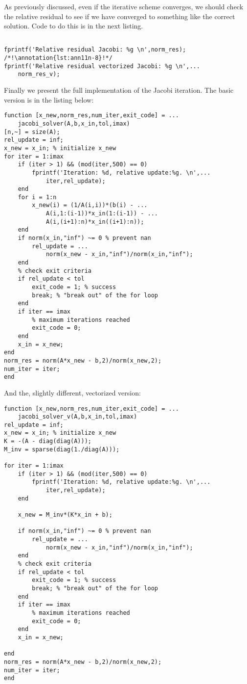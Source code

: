 As previously discussed, even if the iterative scheme converges, we should check the relative residual to see if we have converged to something like the correct solution.  Code to do this is in the next listing.
\begin{lstlisting}[style=myMatlab, name=lec11n_jacobi]
%% Check Relative Residual

fprintf('Relative residual Jacobi: %g \n',norm_res); /*!\annotation{lst:ann11n-8}!*/
fprintf('Relative residual vectorized Jacobi: %g \n',...
    norm_res_v);
\end{lstlisting}

Finally we present the full implementation of the Jacobi iteration.  The basic version is in the listing below:
\begin{lstlisting}[style=myMatlab, name=lec11n-jacobi]
%% Local functions
function [x_new,norm_res,num_iter,exit_code] = ...
    jacobi_solver(A,b,x_in,tol,imax)
[n,~] = size(A);
rel_update = inf;
x_new = x_in; % initialize x_new
for iter = 1:imax
    if (iter > 1) && (mod(iter,500) == 0)
        fprintf('Iteration: %d, relative update:%g. \n',...
            iter,rel_update);
    end 
    for i = 1:n
        x_new(i) = (1/A(i,i))*(b(i) - ...
            A(i,1:(i-1))*x_in(1:(i-1)) - ...
            A(i,(i+1):n)*x_in((i+1):n));
    end
    if norm(x_in,"inf") ~= 0 % prevent nan
        rel_update = ...
            norm(x_new - x_in,"inf")/norm(x_in,"inf");
    end    
    % check exit criteria
    if rel_update < tol
        exit_code = 1; % success
        break; % "break out" of the for loop
    end    
    if iter == imax
        % maximum iterations reached
        exit_code = 0; 
    end
    x_in = x_new;    
end
norm_res = norm(A*x_new - b,2)/norm(x_new,2);
num_iter = iter;
end
\end{lstlisting}
And the, slightly different, vectorized version:

\begin{lstlisting}[style=myMatlab, name=lec11n-jacobi]
function [x_new,norm_res,num_iter,exit_code] = ...
    jacobi_solver_v(A,b,x_in,tol,imax)
rel_update = inf;
x_new = x_in; % initialize x_new
K = -(A - diag(diag(A)));
M_inv = sparse(diag(1./diag(A)));

for iter = 1:imax
    if (iter > 1) && (mod(iter,500) == 0)
        fprintf('Iteration: %d, relative update:%g. \n',...
            iter,rel_update);
    end
    
    x_new = M_inv*(K*x_in + b);

    if norm(x_in,"inf") ~= 0 % prevent nan
        rel_update = ...
            norm(x_new - x_in,"inf")/norm(x_in,"inf");
    end    
    % check exit criteria
    if rel_update < tol
        exit_code = 1; % success
        break; % "break out" of the for loop
    end    
    if iter == imax
        % maximum iterations reached
        exit_code = 0; 
    end
    x_in = x_new;
    
end
norm_res = norm(A*x_new - b,2)/norm(x_new,2);
num_iter = iter;
end
\end{lstlisting}

